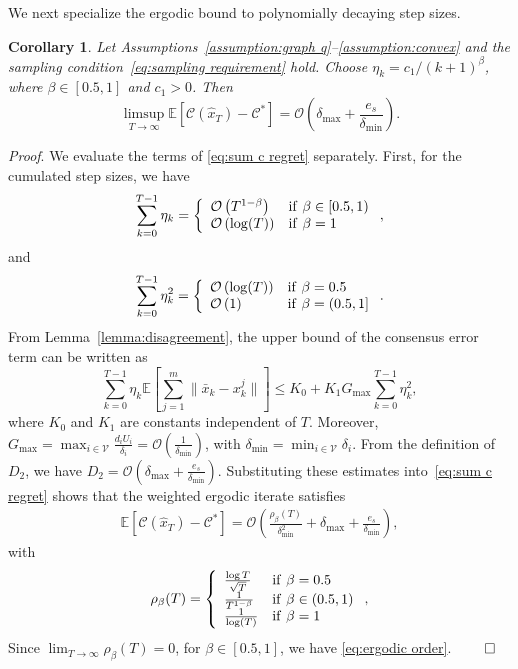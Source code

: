\documentclass[twocolumn]{autart}    %
\newcommand{\order}[1]{\mathcal{O}\left(#1\right)}
\newcommand{\brk}[1]{\left[#1\right]}
\newtheorem{corollary}{Corollary}
\newcommand{\1}{\mathbf{1}}
\begin{document}
We next specialize the ergodic bound to polynomially decaying step sizes.   
\begin{corollary} 
\label{cor:convergence_rate}
Let Assumptions~\ref{assumption:graph q}--\ref{assumption:convex} and the sampling condition~\eqref{eq:sampling requirement}  hold. 
Choose $\eta_k=c_1/(k+1)^\beta$, where $\beta\in[0.5,1]$ and $c_1>0$. Then
\begin{equation}\label{eq:ergodic order}
\mathop{\lim\sup}_{T \to \infty} \mathbb{E}\brk{\mathcal{C}(\hat{x}_T) - \mathcal{C}^\ast} =  \order{\delta_{\max} + \frac{e_s}{\delta_{\min}}}.
\end{equation} 
\end{corollary}
\textit{Proof}.  We evaluate the terms of \eqref{eq:sum c regret} separately.
First, for the cumulated step sizes, we have 
\begin{align*}
\sum_{k=0}^{T-1} \eta_k = \left\{\begin{array}{ll}
  \order{T^{1-\beta}}    &  {\rm if}~ \beta \in [0.5, 1)\\ 
\order{\log(T)}      &  {\rm if}~ \beta = 1
\end{array}\right.,
\end{align*}
and
\begin{align*}
\sum_{k=0}^{T-1} \eta_k^2 = \left\{\begin{array}{ll}
 \order{\log(T)}    &  {\rm if}~ \beta = 0.5\\ 
\order{1}      &  {\rm if}~ \beta = (0.5, 1]
\end{array}\right. .
\end{align*}
From Lemma~\ref{lemma:disagreement},  the upper bound of the consensus error term can be written as $$\sum_{k=0}^{T-1}  \eta_k  \mathbb{E}\brk{\sum_{j=1}^{m}\|\bar{x}_k-x_k^j\|} \le K_0 + K_1G_{\max}\sum_{k=0}^{T-1}\eta_k^2,$$
where $K_0$ and $K_1$ are constants independent of $T$. 
Moreover, $G_{\max}  = \max_{i\in \mathcal{V}}\frac{d_iU_i}{\delta_i}=\order{\frac{1}{\delta_{\min}}}$, with $\delta_{\min} = \min_{i\in\mathcal{V}}\delta_i$. 
From the definition of $D_2$, we have $D_2 = \order{\delta_{\max}+ \frac{e_s}{\delta_{\min}}}$.
Substituting these estimates into~\eqref{eq:sum c regret} shows that the weighted ergodic iterate satisfies
\begin{align}\label{eq:finite-horizon order ergodic}
  \mathbb{E}\brk{\mathcal{C}(\hat{x}_T)-\mathcal{C}^\ast}  =   \order{ \frac{\rho_\beta(T)}{\delta_{\min}^2 } + \delta_{\max}+ \frac{e_s}{\delta_{\min}}} ,  
\end{align}
with 
\begin{align*}
\rho_\beta(T)
 = \left\{\begin{array}{ll}
  \frac{\log T}{\sqrt{T}}   &  {\rm if}~\beta=0.5 \\
  \frac{1}{T^{1-\beta}}&  {\rm if}~ \beta \in (0.5, 1)\\ 
\frac{1}{\log(T) }     &  {\rm if}~ \beta = 1
\end{array}\right.,
\end{align*}
Since $\lim_{T\to\infty}\rho_\beta(T)=0$, for $\beta\in[0.5,1]$, we have \eqref{eq:ergodic order}.
\hfill $\qed$
\end{document}
